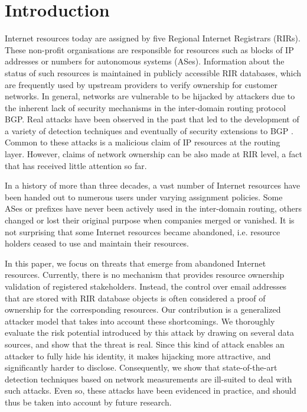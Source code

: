 \documentclass{llncs}
\begin{document}
\section{Introduction} \label{sec:introduction}

Internet resources today are assigned by five Regional Internet Registrars
(RIRs).  These non-profit organisations are responsible for resources such as
blocks of IP addresses or numbers for autonomous systems (ASes). Information
about the status of such resources is maintained in publicly accessible RIR
databases, which are frequently used by upstream providers to verify ownership
for customer networks. In general, networks are vulnerable to be hijacked by
attackers due to the inherent lack of security mechanisms in the inter-domain
routing protocol BGP. Real attacks have been observed in the past that led to
the development of a variety of detection techniques and eventually of security
extensions to BGP \cite{Kent2000,RFC-6480}. Common to these attacks is a
malicious claim of IP resources at the routing layer. However, claims of
network ownership can be also made at RIR level, a fact that has received
little attention so far.

In a history of more than three decades, a vast number of Internet resources
have been handed out to numerous users under varying assignment policies. Some
ASes or prefixes have never been actively used in the inter-domain routing,
others changed or lost their original purpose when companies merged or
vanished. It is not surprising that some Internet resources became abandoned,
i.e. resource holders ceased to use and maintain their resources.

In this paper, we focus on threats that emerge from abandoned Internet
resources. Currently, there is no mechanism that provides resource ownership
validation of registered stakeholders. Instead, the control over email
addresses that are stored with RIR database objects is often considered a proof
of ownership for the corresponding resources.  Our contribution is a generalized
attacker model that takes into account these shortcomings. We thoroughly
evaluate the risk potential introduced by this attack by drawing on several
data sources, and show that the threat is real. Since this kind of attack
enables an attacker to fully hide his identity, it makes hijacking more
attractive, and significantly harder to disclose. Consequently, we show that
state-of-the-art detection techniques based on network measurements are
ill-suited to deal with such attacks. Even so, these attacks have been
evidenced in practice, and should thus be taken into account by future
research.
\end{document}
